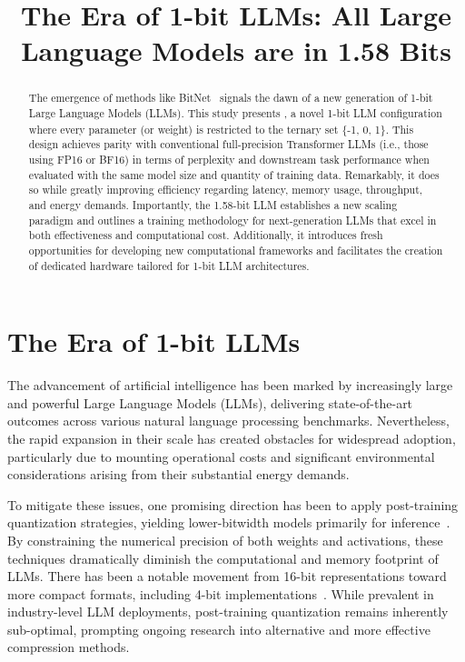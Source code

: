 \title{The Era of 1-bit LLMs: All Large Language Models are in 1.58 Bits}

\begin{abstract}
The emergence of methods like BitNet~\cite{bitnet} signals the dawn of a new generation of 1-bit Large Language Models (LLMs). This study presents \textbf{}, a novel 1-bit LLM configuration where every parameter (or weight) is restricted to the ternary set \{-1, 0, 1\}. This design achieves parity with conventional full-precision Transformer LLMs (i.e., those using FP16 or BF16) in terms of perplexity and downstream task performance when evaluated with the same model size and quantity of training data. Remarkably, it does so while greatly improving efficiency regarding latency, memory usage, throughput, and energy demands. Importantly, the 1.58-bit LLM establishes a new scaling paradigm and outlines a training methodology for next-generation LLMs that excel in both effectiveness and computational cost. Additionally, it introduces fresh opportunities for developing new computational frameworks and facilitates the creation of dedicated hardware tailored for 1-bit LLM architectures.
\end{abstract}

\section{The Era of 1-bit LLMs}

The advancement of artificial intelligence has been marked by increasingly large and powerful Large Language Models (LLMs), delivering state-of-the-art outcomes across various natural language processing benchmarks. Nevertheless, the rapid expansion in their scale has created obstacles for widespread adoption, particularly due to mounting operational costs and significant environmental considerations arising from their substantial energy demands.

To mitigate these issues, one promising direction has been to apply post-training quantization strategies, yielding lower-bitwidth models primarily for inference~\cite{smoothquant, gptq, quip, quip_sharp}. By constraining the numerical precision of both weights and activations, these techniques dramatically diminish the computational and memory footprint of LLMs. There has been a notable movement from 16-bit representations toward more compact formats, including 4-bit implementations~\cite{gptq, awq}. While prevalent in industry-level LLM deployments, post-training quantization remains inherently sub-optimal, prompting ongoing research into alternative and more effective compression methods.

